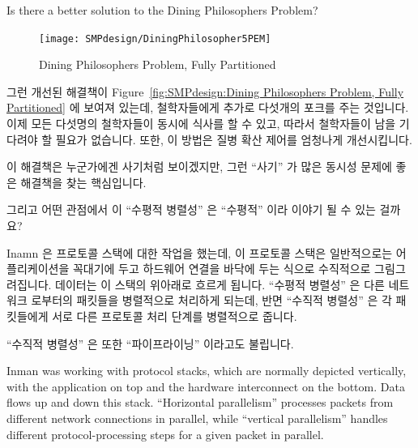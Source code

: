 \begin{enumerate}
	Is there a better solution to the Dining
	Philosophers Problem?
	\fi
\QuickA{}

\begin{figure}[tb]
\begin{center}
\texttt{[image: SMPdesign/DiningPhilosopher5PEM]}
\end{center}
\caption{Dining Philosophers Problem, Fully Partitioned}
\end{figure}

	그런 개선된 해결책이
	Figure~\ref{fig:SMPdesign:Dining Philosophers Problem, Fully Partitioned}
	에 보여져 있는데, 철학자들에게 추가로 다섯개의 포크를 주는 것입니다.
	이제 모든 다섯명의 철학자들이 동시에 식사를 할 수 있고, 따라서
	철학자들이 남을 기다려야 할 필요가 없습니다.
	또한, 이 방법은 질병 확산 제어를 엄청나게 개선시킵니다.

	이 해결책은 누군가에겐 사기처럼 보이겠지만, 그런 ``사기'' 가 많은
	동시성 문제에 좋은 해결책을 찾는 핵심입니다.

\QuickQ{}
	그리고 어떤 관점에서 이 ``수평적 병렬성'' 은 ``수평적'' 이라 이야기 될
	수 있는 걸까요?

\QuickA{}
	Inamn 은 프로토콜 스택에 대한 작업을 했는데, 이 프로토콜 스택은
	일반적으로는 어플리케이션을 꼭대기에 두고 하드웨어 연결을 바닥에 두는
	식으로 수직적으로 그림그려집니다.
	데이터는 이 스택의 위아래로 흐르게 됩니다.
	``수평적 병렬성'' 은 다른 네트워크 로부터의 패킷들을 병렬적으로
	처리하게 되는데, 반면 ``수직적 병렬성'' 은 각 패킷들에게 서로 다른
	프로토콜 처리 단계를 병렬적으로 줍니다.

	``수직적 병렬성'' 은 또한 ``파이프라이닝'' 이라고도 불립니다.
	\iffalse

	Inman was working with protocol stacks, which are normally
	depicted vertically, with the application on top and the
	hardware interconnect on the bottom.
	Data flows up and down this stack.
	``Horizontal parallelism'' processes packets from different network
	connections in parallel, while ``vertical parallelism''
	handles different protocol-processing steps for a given
	packet in parallel.


\end{enumerate}
